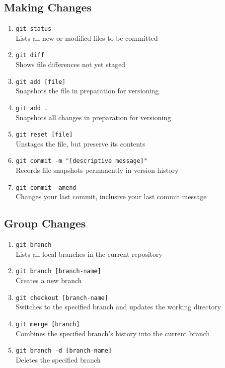 \documentclass[a4paper, twoside, 11pt]{extarticle}
\newenvironment{enumx} {
    \begin{enumerate}[leftmargin=*]
    \setlength{\topsep}{0pt}
    \setlength{\itemsep}{0pt}
    \setlength{\parskip}{0pt}
    \setlength{\parsep}{0pt}
    }
{\end{enumerate}}
\begin{document}
\begin{multicols}{3}
\subsection{Making Changes}
\begin{enumx}
    \item \texttt{git status}\\
    Lists all new or modified files to be committed
    \item \texttt{git diff}\\
    Shows file differences not yet staged
    \item \texttt{git add [file]}\\
    Snapshots the file in preparation for versioning
    \item \texttt{git add .}\\
    Snapshots all changes in preparation for versioning
    \item \texttt{git reset [file]}\\
    Unstages the file, but preserve its contents
    \item \texttt{git commit -m "[descriptive message]"}\\
    Records file snapshots permanently in version history
    \item \texttt{git commit --amend}\\
    Changes your last commit, inclusive your last commit message
\end{enumx}

\subsection{Group Changes}
\begin{enumx}
    \item \texttt{git branch}\\
    Lists all local branches in the current repository
    \item \texttt{git branch [branch-name]}\\
    Creates a new branch
    \item \texttt{git checkout [branch-name]}\\
    Switches to the specified branch and updates the working directory
    \item \texttt{git merge [branch]}\\
    Combines the specified branch’s history into the current branch
    \item \texttt{git branch -d [branch-name]}\\
    Deletes the specified branch
\end{enumx}


\end{multicols}
\end{document}
